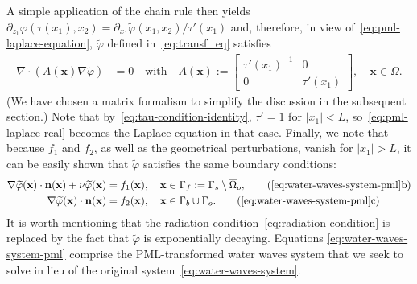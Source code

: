 \documentclass[review,hidelinks,onefignum,onetabnum]{siamart220329}
\newcommand{\bn}{\mathbf{n}}
\newcommand{\bx}{\mathbf{x}}
\newcommand{\tvarphi}{\widetilde \varphi}
\begin{document}
A simple application of the chain rule then yields $\partial_{z_1} \varphi(\tau(x_1),x_2) = \partial_{x_1} \tvarphi(x_1,x_2)/\tau'(x_1) $ 
and, therefore, in view of~\eqref{eq:pml-laplace-equation},  $\tvarphi$ defined in~\eqref{eq:transf_eq} satisfies
\begin{subequations}
\begin{align}
  \label{eq:pml-laplace-real}
  \nabla \cdot (A(\bx) \nabla \tvarphi) &= 0  \quad \mbox{with} \quad A(\bx) :=   
  \begin{bmatrix}
    \tau'(x_1)^{-1} & 0 \\
    0 & \tau'(x_1)
  \end{bmatrix}, \quad \bx \in \Omega.
\end{align}
\label{eq:water-waves-system-pml}
\end{subequations}
(We have chosen a matrix formalism to simplify the discussion in the subsequent section.) Note that by~\cref{eq:tau-condition-identity}, $\tau' = 1$ for $|x_1| < L$,  so~\cref{eq:pml-laplace-real} becomes the Laplace equation in that case. Finally, we note that because $f_1$ and $f_2$, as well as the geometrical perturbations, vanish for $|x_1|>L$, it can be easily shown that $\tvarphi$ satisfies the same boundary conditions:
%
\begin{subequations}
\begin{align}
    \label{eq:pml-free-surface-bc}
    \nabla \tvarphi(\bx) \cdot \bn(\bx) + \nu\tvarphi(\bx)&=f_1(\bx), \quad \bx \in \Gamma_f:=\Gamma_s\setminus\overline\Omega_o, \tag{\ref{eq:water-waves-system-pml}b}\\
    \label{eq:pml-solid-bc}  
    \nabla \tvarphi(\bx) \cdot \bn(\bx) &=f_2(\bx), \quad \bx \in \Gamma_b \cup \Gamma_o. \tag{\ref{eq:water-waves-system-pml}c}
\end{align}
\end{subequations}
It is worth mentioning that the radiation condition~\cref{eq:radiation-condition} is replaced by the fact that $\tvarphi$ is exponentially decaying. Equations \cref{eq:water-waves-system-pml} comprise the PML-transformed water waves system that we seek to solve in lieu of the original system~\cref{eq:water-waves-system}.
\end{document}
